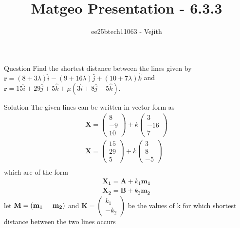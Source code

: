 \documentclass{beamer}
\title{Matgeo Presentation - 6.3.3}
\author{ee25btech11063 - Vejith}
\numberwithin{equation}{section}
\providecommand{\brak}[1]{\ensuremath{\left(#1\right)}}
\theoremstyle{remark}
\newcommand{\myvec}[1]{\ensuremath{\begin{pmatrix}#1\end{pmatrix}}}
\let\vec\mathbf
\begin{document}
\frame{\titlepage}
\begin{frame}{Question}
Find the shortest distance between the lines given by\\
$\vec{r} = (8 + 3\lambda) \hat{i} - (9 + 16\lambda) \hat{j} + (10 + 7\lambda) \hat{k}$ and $ \vec{r} = 15 \hat{i} + 29 \hat{j} + 5 \hat{k} + \mu (3 \hat{i} + 8 \hat{j} - 5 \hat{k}).$
\end{frame}

\begin{frame}{Solution}
The given lines can be written in vector form as
\begin{align}
    \vec{X}=\myvec{8\\-9\\10}+k\myvec{3\\-16\\7}\\
    \vec{X}=\myvec{15\\29\\5}+k\myvec{3\\8\\-5}\\
    \end{align}
which are of the form
\begin{align}
    \vec{X_1}=\vec{A} + k_1\vec{m_1}\\
    \vec{X_2}=\vec{B} + k_2\vec{m_2}
    \end{align}
     let  $\vec{M}=\brak{\vec{m_1}\hspace{0.5cm}\vec{m_2}}$  and  $\vec{K}=\myvec{k_1\\-k_2}$ be the values of k for which shortest distance between the two lines occurs 
\end{frame}
\end{document}
